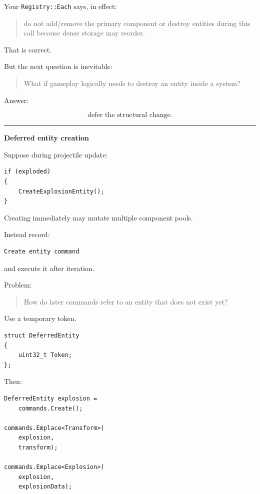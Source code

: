Your \texttt{Registry::Each} says, in effect:

\begin{quote}
do not add/remove the primary component or destroy entities during this call because dense storage may reorder.
\end{quote}

That is correct.

But the next question is inevitable:

\begin{quote}
What if gameplay logically needs to destroy an entity inside a system?
\end{quote}

Answer:

\[
\boxed{
\text{defer the structural change}.
}
\]

\begin{center}\rule{0.5\linewidth}{0.5pt}\end{center}

\textbf{Deferred entity creation}

Suppose during projectile update:

\begin{verbatim}
if (exploded)
{
    CreateExplosionEntity();
}
\end{verbatim}

Creating immediately may mutate multiple component pools.

Instead record:

\begin{verbatim}
Create entity command
\end{verbatim}

and execute it after iteration.

Problem:

\begin{quote}
How do later commands refer to an entity that does not exist yet?
\end{quote}

Use a temporary token.

\begin{verbatim}
struct DeferredEntity
{
    uint32_t Token;
};
\end{verbatim}

Then:

\begin{verbatim}
DeferredEntity explosion =
    commands.Create();

commands.Emplace<Transform>(
    explosion,
    transform);

commands.Emplace<Explosion>(
    explosion,
    explosionData);
\end{verbatim}

